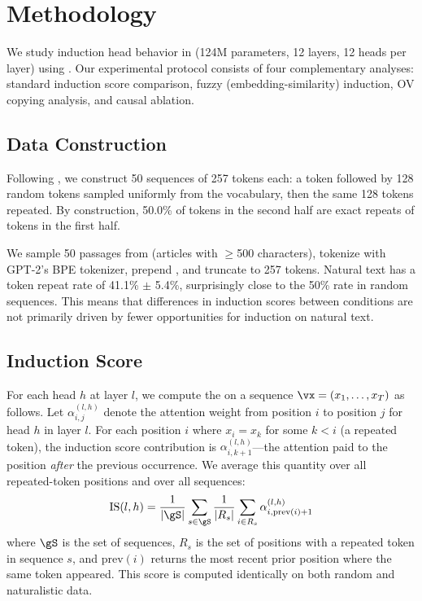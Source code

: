 \section{Methodology}
\label{sec:method}

We study induction head behavior in \gpttwo (124M parameters, 12 layers, 12 heads per layer) using \tlens \cite{nanda2022transformerlens}.
Our experimental protocol consists of four complementary analyses: standard induction score comparison, fuzzy (embedding-similarity) induction, OV copying analysis, and causal ablation.

\subsection{Data Construction}
\label{sec:data}

Following \citet{olsson2022context}, we construct 50 sequences of 257 tokens each: a \bos token followed by 128 random tokens sampled uniformly from the vocabulary, then the same 128 tokens repeated.
By construction, 50.0\% of tokens in the second half are exact repeats of tokens in the first half.

We sample 50 passages from \owt (articles with $\geq$500 characters), tokenize with GPT-2's BPE tokenizer, prepend \bos, and truncate to 257 tokens.
Natural text has a token repeat rate of 41.1\% $\pm$ 5.4\%, surprisingly close to the 50\% rate in random sequences.
This means that differences in induction scores between conditions are not primarily driven by fewer opportunities for induction on natural text.

\subsection{Induction Score}
\label{sec:induction_score}

For each head $h$ at layer $l$, we compute the  on a sequence $\vx = (x_1, \ldots, x_T)$ as follows.
Let $\alpha^{(l,h)}_{i,j}$ denote the attention weight from position $i$ to position $j$ for head $h$ in layer $l$.
For each position $i$ where $x_i = x_k$ for some $k < i$ (a repeated token), the induction score contribution is $\alpha^{(l,h)}_{i, k+1}$---the attention paid to the position \emph{after} the previous occurrence.
We average this quantity over all repeated-token positions and over all sequences:
\begin{equation}
    \iscore(l, h) = \frac{1}{|\gS|} \sum_{s \in \gS} \frac{1}{|R_s|} \sum_{i \in R_s} \alpha^{(l,h)}_{i, \text{prev}(i)+1}
    \label{eq:iscore}
\end{equation}
where $\gS$ is the set of sequences, $R_s$ is the set of positions with a repeated token in sequence $s$, and $\text{prev}(i)$ returns the most recent prior position where the same token appeared.
This score is computed identically on both random and naturalistic data.


